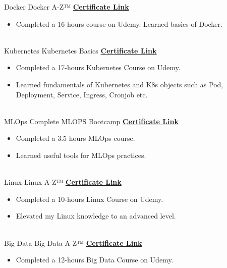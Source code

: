 \documentclass[letterpaper]{DS_class_file} %
\begin{document}
\begin{twenty}
	\twentyitem
	{Docker}
	{}
	{\hspace{0.3cm}Docker A-Z™}
	{\href{https://www.udemy.com/certificate/UC-c1ab98de-9803-452b-9166-8ef3ae797e5a/}{\textbf{Certificate Link}}}
	{}
	{
		{\begin{itemize}
				\item Completed a 16-hours course on Udemy. Learned basics of Docker.
		\end{itemize}}
	}
         \\
        \twentyitem
	{Kubernetes}
	{}
	{\hspace{0.3cm}Kubernetes Basics}
	{\href{https://www.udemy.com/certificate/UC-ffd4189d-0bd4-4cde-9845-bf7c5e5bbf22/}{\textbf{Certificate Link}}}
	{}
	{
		{\begin{itemize}
				\item Completed a 17-hours Kubernetes Course on Udemy.
                    \item Learned fundamentals of Kubernetes and K8s objects such as Pod, Deployment, Service, Ingress, Cronjob etc.
		\end{itemize}}
	}
	\\
	\twentyitem
	{MLOps}
	{}
	{\hspace{0.3cm}Complete MLOPS Bootcamp}
	{\href{https://www.udemy.com/certificate/UC-2296034a-bb96-4d35-80b5-dd956cceeeb7/}{\textbf{Certificate Link}}}
	{}
	{
		{\begin{itemize}
				\item Completed a 3.5 hours MLOps course.
                    \item Learned useful tools for MLOps practices.
		\end{itemize}}
	}
	\\
	\twentyitem
	{Linux}
	{}
	{\hspace{0.3cm}Linux A-Z™}
	{\href{https://www.udemy.com/certificate/UC-74719d94-89af-44ba-ab2d-4299dd2ec3dd/}{\textbf{Certificate Link}}}
	{}
	{
		{\begin{itemize}
				\item Completed a 10-hours Linux Course on Udemy.
				\item Elevated my Linux knowledge to an advanced level.
		\end{itemize}}
	}
	\\
	\twentyitem
	{Big Data}
	{}
	{\hspace{0.3cm}Big Data A-Z™}
	{\href{https://www.udemy.com/certificate/UC-4a851250-cc99-4a9d-8f7c-d8a32ed0a832/}{\textbf{Certificate Link}}}
	{}
	{
		{\begin{itemize}
				\item Completed a 12-hours Big Data Course on Udemy.

\end{itemize}}}
\end{twenty}
\end{document}
